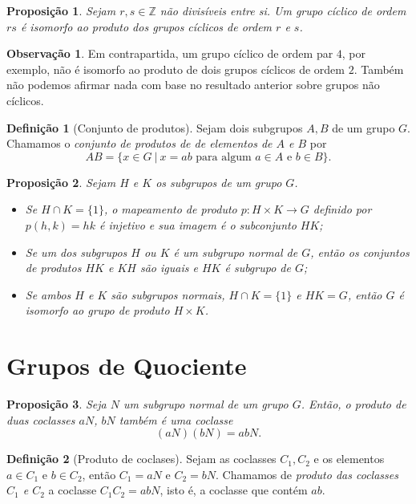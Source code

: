\documentclass[a4paper,12pt]{report}
\theoremstyle{plain}
\newtheorem{proposicao}{Proposição}[section]
\theoremstyle{definition}
\newtheorem{definicao}{Definição}[section]
\newtheorem{observacao}{Observação}[section]
\begin{document}
\begin{proposicao}
	Sejam \(r,s\in\mathbb{Z}\) não divisíveis entre si.
	Um grupo cíclico de ordem \(rs\) é isomorfo ao produto dos grupos
	cíclicos de ordem \(r\) e \(s\).	
\end{proposicao}

\begin{observacao}
	Em contrapartida, um grupo cíclico de ordem par \(4\), por exemplo, não
	é isomorfo ao produto de dois grupos cíclicos de ordem \(2\). Também não
	podemos afirmar nada com base no resultado anterior sobre grupos não
	cíclicos.
\end{observacao}

\begin{definicao}[Conjunto de produtos]
	Sejam dois subgrupos \(A,B\) de um grupo \(G\).
	Chamamos o \emph{conjunto de produtos de de elementos de \(A\) e \(B\)} por
	\[AB = \{x\in G \ | \ x = ab \text{ para algum }a\in A\text{ e }b\in B\}.\]
\end{definicao}

\begin{proposicao}
	Sejam \(H\) e \(K\) os subgrupos de um grupo \(G\).
	\begin{itemize}
		\item Se \(H\cap K = \{1\}\), o mapeamento de produto
		\(p: H\times K\longrightarrow G\) definido por \(p(h,k) = hk\) é
		injetivo e sua imagem é o subconjunto \(HK\);
		\item Se um dos subgrupos
		\(H\) ou \(K\) é um subgrupo normal de \(G\), então os conjuntos de
		produtos \(HK\) e \(KH\) são iguais e \(HK\) é subgrupo de \(G\);
		\item Se ambos \(H\) e \(K\) são subgrupos normais, \(H\cap K = \{1\}\) e
		\(HK = G\), então \(G\) é isomorfo ao grupo de produto \(H\times K\).
	\end{itemize}
\end{proposicao}

\section{Grupos de Quociente}

\begin{proposicao}
	Seja \(N\) um subgrupo normal de um grupo \(G\).
	Então, o produto de duas coclasses \(aN\), \(bN\) também é uma coclasse
	\[(aN) (bN) = abN.\]
\end{proposicao}

\begin{definicao}[Produto de coclases]
	Sejam as coclasses \(C_1, C_2\) e os elementos
	\(a\in C_1\) e \(b\in C_2\), então \(C_1 = aN\) e \(C_2 = bN\). Chamamos
	de \emph{produto das coclasses \(C_1\) e \(C_2\)} a coclasse
	\(C_1C_2 = abN\), isto é, a coclasse que contém \(ab\).	
\end{definicao}
\end{document}
